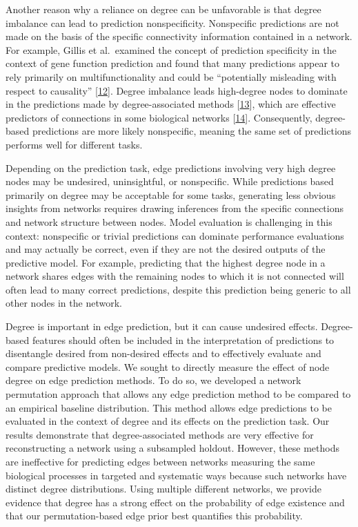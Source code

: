 Another reason why a reliance on degree can be unfavorable is that degree imbalance can lead to prediction nonspecificity.
Nonspecific predictions are not made on the basis of the specific connectivity information contained in a network.
For example, Gillis et al.~examined the concept of prediction specificity in the context of gene function prediction and found that many predictions appear to rely primarily on multifunctionality and could be ``potentially misleading with respect to causality'' {[}\protect\hyperlink{ref-zB6RQrIj}{12}{]}.
Degree imbalance leads high-degree nodes to dominate in the predictions made by degree-associated methods {[}\protect\hyperlink{ref-g059lh8v}{13}{]}, which are effective predictors of connections in some biological networks {[}\protect\hyperlink{ref-1736TBtF6}{14}{]}.
Consequently, degree-based predictions are more likely nonspecific, meaning the same set of predictions performs well for different tasks.

Depending on the prediction task, edge predictions involving very high degree nodes may be undesired, uninsightful, or nonspecific.
While predictions based primarily on degree may be acceptable for some tasks, generating less obvious insights from networks requires drawing inferences from the specific connections and network structure between nodes.
Model evaluation is challenging in this context: nonspecific or trivial predictions can dominate performance evaluations and may actually be correct, even if they are not the desired outputs of the predictive model.
For example, predicting that the highest degree node in a network shares edges with the remaining nodes to which it is not connected will often lead to many correct predictions, despite this prediction being generic to all other nodes in the network.

Degree is important in edge prediction, but it can cause undesired effects.
Degree-based features should often be included in the interpretation of predictions to disentangle desired from non-desired effects and to effectively evaluate and compare predictive models.
We sought to directly measure the effect of node degree on edge prediction methods.
To do so, we developed a network permutation approach that allows any edge prediction method to be compared to an empirical baseline distribution.
This method allows edge predictions to be evaluated in the context of degree and its effects on the prediction task.
Our results demonstrate that degree-associated methods are very effective for reconstructing a network using a subsampled holdout.
However, these methods are ineffective for predicting edges between networks measuring the same biological processes in targeted and systematic ways because such networks have distinct degree distributions.
Using multiple different networks, we provide evidence that degree has a strong effect on the probability of edge existence and that our permutation-based edge prior best quantifies this probability.

